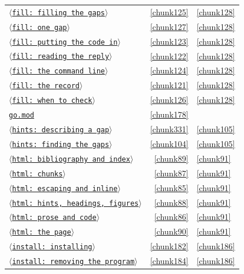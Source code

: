 \documentclass[10pt,a4paper]{article}
\newcounter{chunk}
\newcommand{\chunkname}[1]{\ensuremath{\langle}\texttt{#1}\ensuremath{\rangle}}
\begin{document}
\begin{longtable}{@{}p{}rp{}@{}}
\hyperref[chunk125]{\chunkname{fill: filling the gaps}} & \ref*{chunk125} & \hyperref[chunk128]{\ref*{chunk128}} \\
\hyperref[chunk127]{\chunkname{fill: one gap}} & \ref*{chunk127} & \hyperref[chunk128]{\ref*{chunk128}} \\
\hyperref[chunk123]{\chunkname{fill: putting the code in}} & \ref*{chunk123} & \hyperref[chunk128]{\ref*{chunk128}} \\
\hyperref[chunk122]{\chunkname{fill: reading the reply}} & \ref*{chunk122} & \hyperref[chunk128]{\ref*{chunk128}} \\
\hyperref[chunk124]{\chunkname{fill: the command line}} & \ref*{chunk124} & \hyperref[chunk128]{\ref*{chunk128}} \\
\hyperref[chunk121]{\chunkname{fill: the record}} & \ref*{chunk121} & \hyperref[chunk128]{\ref*{chunk128}} \\
\hyperref[chunk126]{\chunkname{fill: when to check}} & \ref*{chunk126} & \hyperref[chunk128]{\ref*{chunk128}} \\
\hyperref[chunk178]{\texttt{go.\allowbreak{}mod}} & \ref*{chunk178} &  \\
\hyperref[chunk331]{\chunkname{hints: describing a gap}} & \ref*{chunk331} & \hyperref[chunk105]{\ref*{chunk105}} \\
\hyperref[chunk104]{\chunkname{hints: finding the gaps}} & \ref*{chunk104} & \hyperref[chunk105]{\ref*{chunk105}} \\
\hyperref[chunk89]{\chunkname{html: bibliography and index}} & \ref*{chunk89} & \hyperref[chunk91]{\ref*{chunk91}} \\
\hyperref[chunk87]{\chunkname{html: chunks}} & \ref*{chunk87} & \hyperref[chunk91]{\ref*{chunk91}} \\
\hyperref[chunk85]{\chunkname{html: escaping and inline}} & \ref*{chunk85} & \hyperref[chunk91]{\ref*{chunk91}} \\
\hyperref[chunk88]{\chunkname{html: hints, headings, figures}} & \ref*{chunk88} & \hyperref[chunk91]{\ref*{chunk91}} \\
\hyperref[chunk86]{\chunkname{html: prose and code}} & \ref*{chunk86} & \hyperref[chunk91]{\ref*{chunk91}} \\
\hyperref[chunk90]{\chunkname{html: the page}} & \ref*{chunk90} & \hyperref[chunk91]{\ref*{chunk91}} \\
\hyperref[chunk182]{\chunkname{install: installing}} & \ref*{chunk182} & \hyperref[chunk186]{\ref*{chunk186}} \\
\hyperref[chunk184]{\chunkname{install: removing the program}} & \ref*{chunk184} & \hyperref[chunk186]{\ref*{chunk186}} \\

\end{longtable}
\end{document}
